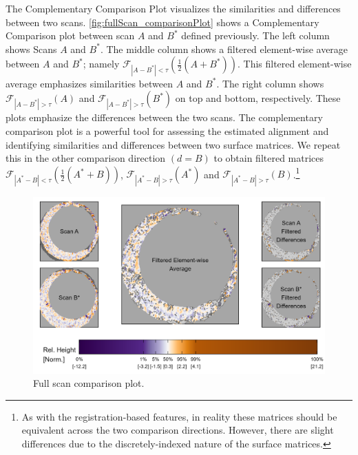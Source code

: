 \documentclass[
]{jdssv}
\begin{document}
The Complementary Comparison Plot visualizes the similarities and
differences between two scans. \autoref{fig:fullScan_comparisonPlot}
shows a Complementary Comparison plot between scan \(A\) and \(B^*\)
defined previously. The left column shows Scans \(A\) and \(B^*\). The
middle column shows a filtered element-wise average between \(A\) and
\(B^*\); namely
\(\mathcal{F}_{|A - B^*| < \tau}\left(\frac{1}{2}(A + B^*)\right)\).
This filtered element-wise average emphasizes similarities between \(A\)
and \(B^*\). The right column shows
\(\mathcal{F}_{|A - B^*| > \tau}(A)\) and
\(\mathcal{F}_{|A - B^*| > \tau}(B^*)\) on top and bottom, respectively.
These plots emphasize the differences between the two scans. The
complementary comparison plot is a powerful tool for assessing the
estimated alignment and identifying similarities and differences between
two surface matrices. We repeat this in the other comparison direction
\((d = B)\) to obtain filtered matrices
\(\mathcal{F}_{|A^* - B| < \tau}\left(\frac{1}{2}(A^* + B)\right)\),
\(\mathcal{F}_{|A^* - B| > \tau}(A^*)\) and
\(\mathcal{F}_{|A^* - B| > \tau}(B)\).\footnote{As with the registration-based features, in reality these matrices should be equivalent across the two comparison directions. However, there are slight differences due to the discretely-indexed nature of the surface matrices.}

\begin{CodeChunk}
\begin{figure}[htbp]

{\centering \includegraphics[width=\textwidth]{figures/fullScan_comparisonPlot} 

}

\caption{\label{fig:fullScan_comparisonPlot} Full scan comparison plot.}\label{fig:unnamed-chunk-19}
\end{figure}
\end{CodeChunk}
\end{document}
